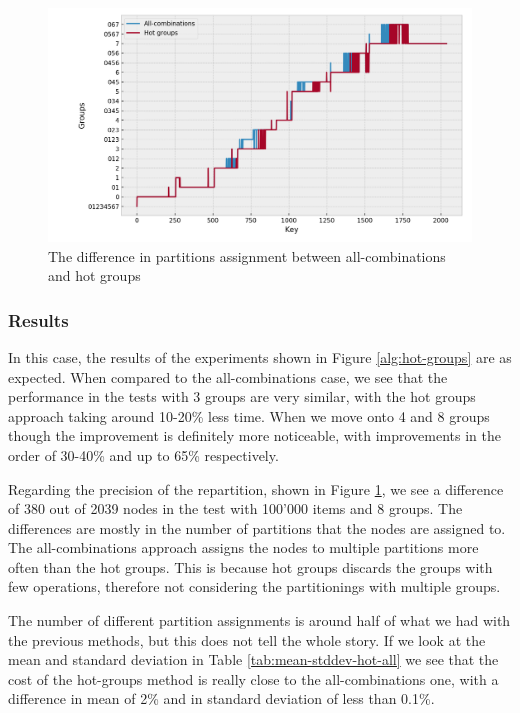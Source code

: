 \begin{figure}[!htb]
  \centering
  \includegraphics[width=\textwidth,height=\textheight,keepaspectratio]{img/partition_difference_hot_all.png}
  \caption{The difference in partitions assignment between all-combinations and hot groups}
  \label{fig:hot-partitioning}
\end{figure}

\subsubsection{Results}
In this case, the results of the experiments shown in Figure \ref{alg:hot-groups} are as expected. When compared to the all-combinations case, we see that the performance in the tests with 3 groups are very similar, with the hot groups approach taking around 10-20\% less time. When we move onto 4 and 8 groups though the improvement is definitely more noticeable, with improvements in the order of 30-40\% and up to 65\% respectively.

Regarding the precision of the repartition, shown in Figure \ref{fig:hot-partitioning}, we see a difference of 380 out of 2039 nodes in the test with 100'000 items and 8 groups.
The differences are mostly in the number of partitions that the nodes are assigned to. The all-combinations approach assigns the nodes to multiple partitions more often than the hot groups. This is because hot groups discards the groups with few operations, therefore not considering the partitionings with multiple groups.

The number of different partition assignments is around half of what we had with the previous methods, but this does not tell the whole story. If we look at the mean and standard deviation in Table \ref{tab:mean-stddev-hot-all} we see that the cost of the hot-groups method is really close to the all-combinations one, with a difference in mean of 2\% and in standard deviation of less than 0.1\%.

